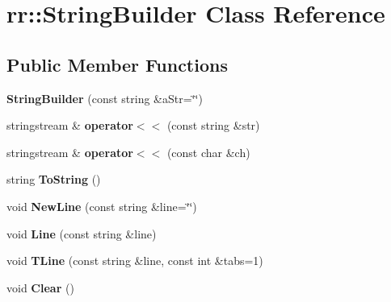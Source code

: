 \hypertarget{classrr_1_1_string_builder}{\section{rr\-:\-:String\-Builder Class Reference}
\label{classrr_1_1_string_builder}
}
\subsection*{Public Member Functions}
\begin{DoxyCompactItemize}
\item 
\hypertarget{classrr_1_1_string_builder_a9865e870221e232becaf532ffcc918fa}{{\bfseries String\-Builder} (const string \&a\-Str=\char`\"{}\char`\"{})}\label{classrr_1_1_string_builder_a9865e870221e232becaf532ffcc918fa}

\item 
\hypertarget{classrr_1_1_string_builder_a70119feb4beaa821983a7f3ffee33075}{stringstream \& {\bfseries operator$<$$<$} (const string \&str)}\label{classrr_1_1_string_builder_a70119feb4beaa821983a7f3ffee33075}

\item 
\hypertarget{classrr_1_1_string_builder_a225e4af9726b19c0466f275702d6bdb5}{stringstream \& {\bfseries operator$<$$<$} (const char \&ch)}\label{classrr_1_1_string_builder_a225e4af9726b19c0466f275702d6bdb5}

\item 
\hypertarget{classrr_1_1_string_builder_a22c778a02f315058633da32250c25bfd}{string {\bfseries To\-String} ()}\label{classrr_1_1_string_builder_a22c778a02f315058633da32250c25bfd}

\item 
\hypertarget{classrr_1_1_string_builder_a66247413c4f61c7e56103c63af32f6f7}{void {\bfseries New\-Line} (const string \&line=\char`\"{}\char`\"{})}\label{classrr_1_1_string_builder_a66247413c4f61c7e56103c63af32f6f7}

\item 
\hypertarget{classrr_1_1_string_builder_a9b9af43f8958012b55538082ab667301}{void {\bfseries Line} (const string \&line)}\label{classrr_1_1_string_builder_a9b9af43f8958012b55538082ab667301}

\item 
\hypertarget{classrr_1_1_string_builder_abde5739b8994e6eb1bb53bdea217ac3c}{void {\bfseries T\-Line} (const string \&line, const int \&tabs=1)}\label{classrr_1_1_string_builder_abde5739b8994e6eb1bb53bdea217ac3c}

\item 
\hypertarget{classrr_1_1_string_builder_a3a466c3f18ad159fa14d41e7c842c59d}{void {\bfseries Clear} ()}\label{classrr_1_1_string_builder_a3a466c3f18ad159fa14d41e7c842c59d}

\end{DoxyCompactItemize}
